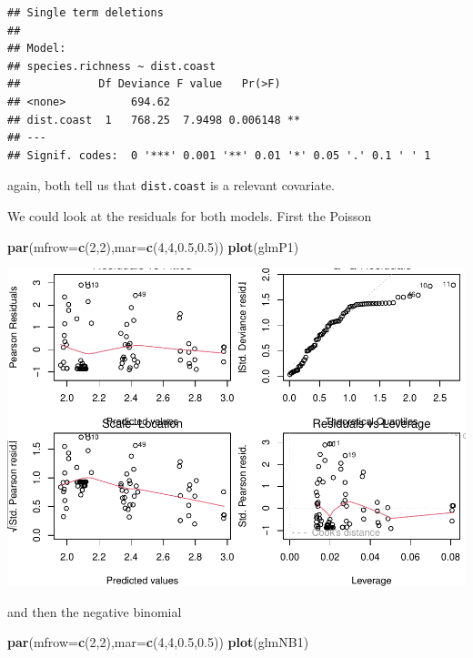 \documentclass[
]{book}
\newenvironment{Shaded}{\begin{snugshade}}{\end{snugshade}}
\newcommand{\AttributeTok}[1]{\textcolor[rgb]{0.13,0.29,0.53}{#1}}
\newcommand{\DecValTok}[1]{\textcolor[rgb]{0.00,0.00,0.81}{#1}}
\newcommand{\FloatTok}[1]{\textcolor[rgb]{0.00,0.00,0.81}{#1}}
\newcommand{\FunctionTok}[1]{\textcolor[rgb]{0.13,0.29,0.53}{\textbf{#1}}}
\newcommand{\NormalTok}[1]{#1}
\begin{document}
\begin{verbatim}
## Single term deletions
## 
## Model:
## species.richness ~ dist.coast
##            Df Deviance F value   Pr(>F)   
## <none>          694.62                    
## dist.coast  1   768.25  7.9498 0.006148 **
## ---
## Signif. codes:  0 '***' 0.001 '**' 0.01 '*' 0.05 '.' 0.1 ' ' 1
\end{verbatim}

again, both tell us that \texttt{dist.coast} is a relevant covariate.

We could look at the residuals for both models. First the Poisson

\begin{Shaded}
\begin{Highlighting}[]
\FunctionTok{par}\NormalTok{(}\AttributeTok{mfrow=}\FunctionTok{c}\NormalTok{(}\DecValTok{2}\NormalTok{,}\DecValTok{2}\NormalTok{),}\AttributeTok{mar=}\FunctionTok{c}\NormalTok{(}\DecValTok{4}\NormalTok{,}\DecValTok{4}\NormalTok{,}\FloatTok{0.5}\NormalTok{,}\FloatTok{0.5}\NormalTok{))}
\FunctionTok{plot}\NormalTok{(glmP1)}
\end{Highlighting}
\end{Shaded}

\includegraphics{ECOMODbook_files/figure-latex/unnamed-chunk-101-1.pdf}

and then the negative binomial

\begin{Shaded}
\begin{Highlighting}[]
\FunctionTok{par}\NormalTok{(}\AttributeTok{mfrow=}\FunctionTok{c}\NormalTok{(}\DecValTok{2}\NormalTok{,}\DecValTok{2}\NormalTok{),}\AttributeTok{mar=}\FunctionTok{c}\NormalTok{(}\DecValTok{4}\NormalTok{,}\DecValTok{4}\NormalTok{,}\FloatTok{0.5}\NormalTok{,}\FloatTok{0.5}\NormalTok{))}
\FunctionTok{plot}\NormalTok{(glmNB1)}
\end{Highlighting}
\end{Shaded}
\end{document}
